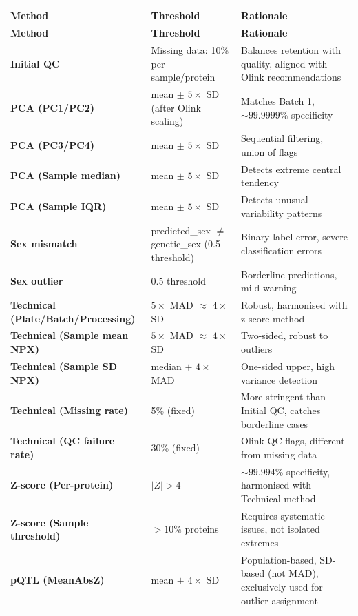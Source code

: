 \documentclass[11pt,a4paper]{article}
\begin{document}
{\footnotesize
\renewcommand{\arraystretch}{1.1}
\begin{longtable}{p{3.5cm}p{5.5cm}p{6cm}}
\toprule
\textbf{Method} & \textbf{Threshold} & \textbf{Rationale} \\
\midrule
\endfirsthead

\toprule
\textbf{Method} & \textbf{Threshold} & \textbf{Rationale} \\
\midrule
\endhead

\bottomrule
\endfoot

\textbf{Initial QC} & Missing data: 10\% per sample/protein & Balances retention with quality, aligned with Olink recommendations \\
\textbf{PCA (PC1/PC2)} & mean $\pm$ $5 \times$ SD (after Olink scaling) & Matches Batch 1, $\sim 99.9999\%$ specificity \\
\textbf{PCA (PC3/PC4)} & mean $\pm$ $5 \times$ SD & Sequential filtering, union of flags \\
\textbf{PCA (Sample median)} & mean $\pm$ $5 \times$ SD & Detects extreme central tendency \\
\textbf{PCA (Sample IQR)} & mean $\pm$ $5 \times$ SD & Detects unusual variability patterns \\
\textbf{Sex mismatch} & predicted\_sex $\neq$ genetic\_sex (0.5 threshold) & Binary label error, severe classification errors \\
\textbf{Sex outlier} & 0.5 threshold & Borderline predictions, mild warning \\
\textbf{Technical (Plate/Batch/Processing)} & $5 \times$ MAD $\approx$ $4 \times$ SD & Robust, harmonised with z-score method \\
\textbf{Technical (Sample mean NPX)} & $5 \times$ MAD $\approx$ $4 \times$ SD & Two-sided, robust to outliers \\
\textbf{Technical (Sample SD NPX)} & median $+$ $4 \times$ MAD & One-sided upper, high variance detection \\
\textbf{Technical (Missing rate)} & 5\% (fixed) & More stringent than Initial QC, catches borderline cases \\
\textbf{Technical (QC failure rate)} & 30\% (fixed) & Olink QC flags, different from missing data \\
\textbf{Z-score (Per-protein)} & $|Z| > 4$ & $\sim 99.994\%$ specificity, harmonised with Technical method \\
\textbf{Z-score (Sample threshold)} & $>10\%$ proteins & Requires systematic issues, not isolated extremes \\
\textbf{pQTL (MeanAbsZ)} & mean $+$ $4 \times$ SD & Population-based, SD-based (not MAD), exclusively used for outlier assignment \\
\bottomrule
\end{longtable}
\renewcommand{\arraystretch}{1.0}
}
\end{document}
